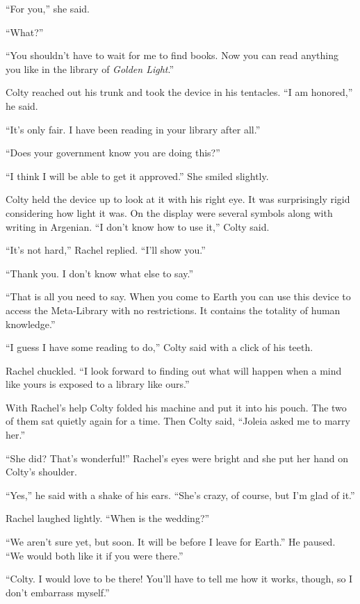 ``For you,'' she said.

``What?''

``You shouldn't have to wait for me to find books. Now you can read anything you like in the
library of \textit{Golden Light}.''

Colty reached out his trunk and took the device in his tentacles. ``I am honored,'' he said.

``It's only fair. I have been reading in your library after all.''

``Does your government know you are doing this?''

``I think I will be able to get it approved.'' She smiled slightly.

Colty held the device up to look at it with his right eye. It was surprisingly rigid considering
how light it was. On the display were several symbols along with writing in Argenian. ``I don't
know how to use it,'' Colty said.

``It's not hard,'' Rachel replied. ``I'll show you.''

``Thank you. I don't know what else to say.''

``That is all you need to say. When you come to Earth you can use this device to access the
Meta-Library with no restrictions. It contains the totality of human knowledge.''

``I guess I have some reading to do,'' Colty said with a click of his teeth.

Rachel chuckled. ``I look forward to finding out what will happen when a mind like yours is
exposed to a library like ours.''

With Rachel's help Colty folded his machine and put it into his pouch. The two of them sat
quietly again for a time. Then Colty said, ``Joleia asked me to marry her.''

``She did? That's wonderful!'' Rachel's eyes were bright and she put her hand on Colty's
shoulder.

``Yes,'' he said with a shake of his ears. ``She's crazy, of course, but I'm glad of it.''

Rachel laughed lightly. ``When is the wedding?''

``We aren't sure yet, but soon. It will be before I leave for Earth.'' He paused. ``We would
both like it if you were there.''

``Colty. I would love to be there! You'll have to tell me how it works, though, so I don't
embarrass myself.''

\spacebreak


